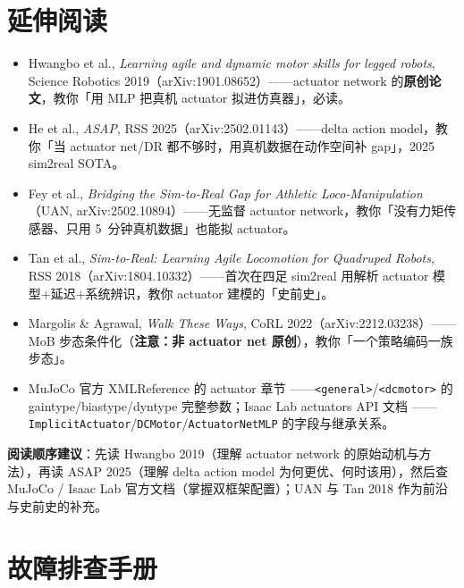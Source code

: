 \section*{延伸阅读}
\label{sec:rlmc-act-further}

\begin{itemize}
  \item Hwangbo et al., \emph{Learning agile and dynamic motor skills for legged robots}, Science Robotics 2019（arXiv:1901.08652）\cite{hwangbo2019}——actuator network 的\textbf{原创论文}，教你「用 MLP 把真机 actuator 拟进仿真器」，必读。
  \item He et al., \emph{ASAP}, RSS 2025（arXiv:2502.01143）\cite{he2025asap}——delta action model，教你「当 actuator net/DR 都不够时，用真机数据在动作空间补 gap」，2025 sim2real SOTA。
  \item Fey et al., \emph{Bridging the Sim-to-Real Gap for Athletic Loco-Manipulation}（UAN, arXiv:2502.10894）\cite{fey2025uan}——无监督 actuator network，教你「没有力矩传感器、只用 5~分钟真机数据」也能拟 actuator。
  \item Tan et al., \emph{Sim-to-Real: Learning Agile Locomotion for Quadruped Robots}, RSS 2018（arXiv:1804.10332）\cite{tan2018simtoreal}——首次在四足 sim2real 用解析 actuator 模型$+$延迟$+$系统辨识，教你 actuator 建模的「史前史」。
  \item Margolis \& Agrawal, \emph{Walk These Ways}, CoRL 2022（arXiv:2212.03238）\cite{margolis2022walk}——MoB 步态条件化（\textbf{注意：非 actuator net 原创}），教你「一个策略编码一族步态」。
  \item MuJoCo 官方 XMLReference 的 actuator 章节 \cite{todorov2012mujoco}——\verb|<general>|/\verb|<dcmotor>| 的 gaintype/biastype/dyntype 完整参数；Isaac Lab actuators API 文档 \cite{mittal2025isaaclab}——\verb|ImplicitActuator|/\verb|DCMotor|/\verb|ActuatorNetMLP| 的字段与继承关系。
\end{itemize}

\textbf{阅读顺序建议}：先读 Hwangbo 2019（理解 actuator network 的原始动机与方法），再读 ASAP 2025（理解 delta action model 为何更优、何时该用），然后查 MuJoCo / Isaac Lab 官方文档（掌握双框架配置）；UAN 与 Tan 2018 作为前沿与史前史的补充。

\section*{故障排查手册}
\label{sec:rlmc-act-troubleshoot}

